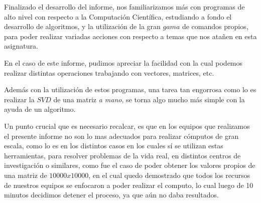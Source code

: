 Finalizado el desarrollo del informe,
nos familiarizamos más con programas de alto nivel
con respecto a la Computación Científica,
estudiando a fondo el desarrollo de algoritmos,
y la utilización de la gran $gama$ de comandos propios,
para poder realizar variadas acciones con respecto a temas que nos
atañen en esta asignatura.

En el caso de este informe,
pudimos apreciar la facilidad con la cual podemos
realizar distintas operaciones trabajando con
vectores, matrices, etc.

Además con la utilización de estos programas,
una tarea tan engorrosa como lo es realizar la
$SVD$ de una matriz \emph{a mano},
se torna algo mucho más simple
con la ayuda de un algoritmo.

Un punto crucial que es necesario recalcar,
es que en los equipos que realizamos el presente informe
no son lo  mas adecuados para realizar cómputos
de gran escala, como lo es en los distintos casos
en los cuales sí se utilizan estas herramientas,
para resolver problemas de la vida real,
en distintos centros de investigación o similares,
como fue el caso de poder obtener los valores propios de una matriz de
$10000x10000$, en el cual quedo demostrado que todos los recursos de nuestros
equipos se enfocaron a poder realizar el computo, lo cual luego de 10 minutos
decidimos detener el proceso, ya que aún no daba resultados.
